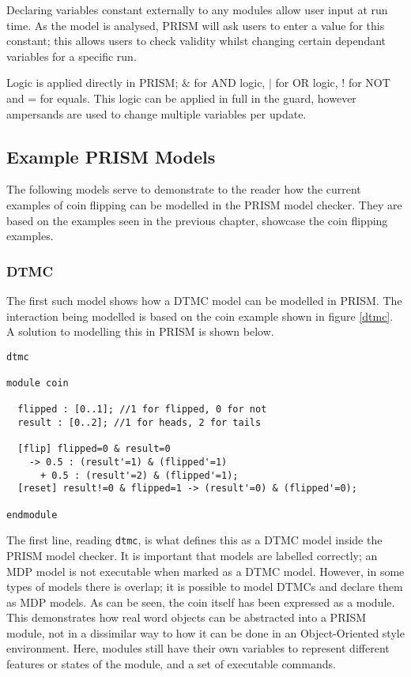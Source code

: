 \documentclass{l4proj}
\begin{document}
Declaring variables constant externally to any modules allow user input at run time. As the model is analysed, PRISM will ask users to enter a value for this constant; this allows users to check validity whilst changing certain dependant variables for a specific run.

Logic is applied directly in PRISM; $ \& $ for AND logic, $ \mid $ for OR logic, ! for NOT and = for equals. This logic can be applied in full in the guard, however ampersands are used to change multiple variables per update.



\subsection{Example PRISM Models}

The following models serve to demonstrate to the reader how the current examples of coin flipping can be modelled in the PRISM model checker. They are based on the examples seen in the previous chapter, showcase the coin flipping examples.

\subsubsection{DTMC}

The first such model shows how a DTMC model can be modelled in PRISM. The interaction being modelled is based on the coin example shown in figure \ref{dtmc}. A solution to modelling this in PRISM is shown below.

\begin{verbatim}
dtmc

module coin

  flipped : [0..1]; //1 for flipped, 0 for not
  result : [0..2]; //1 for heads, 2 for tails

  [flip] flipped=0 & result=0 
    -> 0.5 : (result'=1) & (flipped'=1) 
      + 0.5 : (result'=2) & (flipped'=1);
  [reset] result!=0 & flipped=1 -> (result'=0) & (flipped'=0);
	
endmodule
\end{verbatim}

The first line, reading {\tt dtmc}, is what defines this as a DTMC model inside the PRISM model checker. It is important that models are labelled correctly; an MDP model is not executable when marked as a DTMC model. However, in some types of models there is overlap; it is possible to model DTMCs and declare them as MDP models.
As can be seen, the coin itself has been expressed as a module. This demonstrates how real word objects can be abstracted into a PRISM module, not in a dissimilar way to how it can be done in an Object-Oriented style environment. Here, modules still have their own variables to represent different features or states of the module, and a set of executable commands. 
\end{document}
